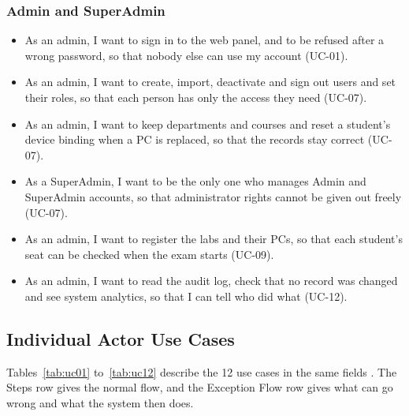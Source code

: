 \subsubsection{Admin and SuperAdmin}
\begin{itemize}[nosep]
    \item As an admin, I want to sign in to the web panel, and to be refused after a wrong password, so that nobody else can use my account (UC-01).
    \item As an admin, I want to create, import, deactivate and sign out users and set their roles, so that each person has only the access they need (UC-07).
    \item As an admin, I want to keep departments and courses and reset a student's device binding when a PC is replaced, so that the records stay correct (UC-07).
    \item As a SuperAdmin, I want to be the only one who manages Admin and SuperAdmin accounts, so that administrator rights cannot be given out freely (UC-07).
    \item As an admin, I want to register the labs and their PCs, so that each student's seat can be checked when the exam starts (UC-09).
    \item As an admin, I want to read the audit log, check that no record was changed and see system analytics, so that I can tell who did what (UC-12).
\end{itemize}

\subsection{Individual Actor Use Cases}

\makeatletter
\newsavebox{\uctbox}
\newcommand{\uctlead}[1]{\par{\interlinepenalty\@M\clubpenalty\@M\widowpenalty\@M #1\par}\nopagebreak}
\makeatother

Tables~\ref{tab:uc01} to~\ref{tab:uc12} describe the 12 use cases in the same fields \cite{use_case_definition}. The Steps row gives the normal flow, and the Exception Flow row gives what can go wrong and what the system then does.

